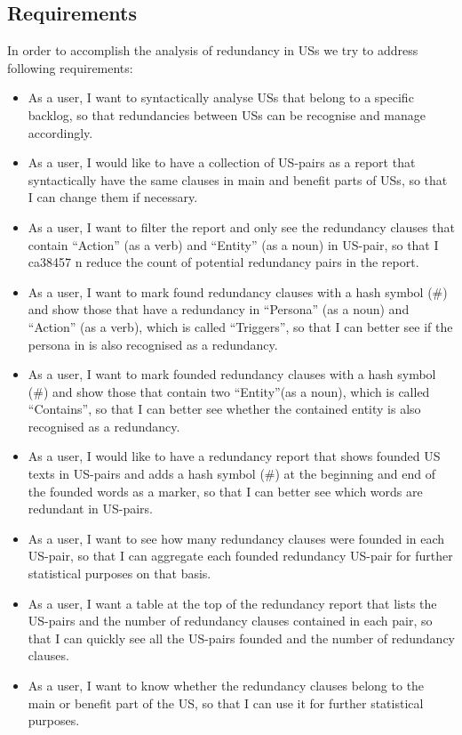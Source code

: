 \subsection{Requirements}\label{redundancy_requirement}
In order to accomplish the analysis of redundancy in USs we try to address following requirements:
\begin{itemize}
\item As a user, I want to syntactically analyse USs that belong to a specific backlog, so that redundancies between USs can be recognise and manage accordingly.
\item As a user, I would like to have a collection of US-pairs as a report that syntactically have the same clauses in main and benefit parts of USs, so that I can change them if necessary.
\item As a user, I want to filter the report and only see the redundancy clauses that contain \enquote{Action} (as a verb) and \enquote{Entity} (as a noun) in US-pair, so that I ca38457
n reduce the count of potential redundancy pairs in the report.
\item As a user, I want to mark found redundancy clauses with a hash symbol (\#) and show those that have a redundancy in \enquote{Persona} (as a noun) and \enquote{Action} (as a verb), which is called \enquote{Triggers}, so that I can better see if the persona in is also recognised as a redundancy.
\item As a user, I want to mark founded redundancy clauses with a hash symbol (\#) and show those that contain two \enquote{Entity}(as a noun), which is called \enquote{Contains}, so that I can better see whether the contained entity is also recognised as a redundancy.
\item As a user, I would like to have a redundancy report that shows founded US texts in US-pairs and adds a hash symbol (\#) at the beginning and end of the founded words as a marker, so that I can better see which words are redundant in US-pairs.
\item As a user, I want to see how many redundancy clauses were founded in each US-pair, so that I can aggregate each founded redundancy US-pair for further statistical purposes on that basis.
\item As a user, I want a table at the top of the redundancy report that lists the US-pairs and the number of redundancy clauses contained in each pair, so that I can quickly see all the US-pairs founded and the number of redundancy clauses. 
\item As a user, I want to know whether the redundancy clauses belong to the main or benefit part of the US, so that I can use it for further statistical purposes.
\end{itemize}

